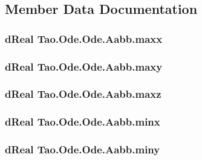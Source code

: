 \subsection{Member Data Documentation}
\hypertarget{struct_tao_1_1_ode_1_1_ode_1_1_aabb_a17707d5ffb42b522263f1e87cf82a1c4}{
\subsubsection[{maxx}]{\setlength{\rightskip}{0pt plus 5cm}dReal {\bf Tao.Ode.Ode.Aabb.maxx}}}
\label{struct_tao_1_1_ode_1_1_ode_1_1_aabb_a17707d5ffb42b522263f1e87cf82a1c4}
\hypertarget{struct_tao_1_1_ode_1_1_ode_1_1_aabb_a9c2841eefd732f6e32b72042b82f31e9}{
\subsubsection[{maxy}]{\setlength{\rightskip}{0pt plus 5cm}dReal {\bf Tao.Ode.Ode.Aabb.maxy}}}
\label{struct_tao_1_1_ode_1_1_ode_1_1_aabb_a9c2841eefd732f6e32b72042b82f31e9}
\hypertarget{struct_tao_1_1_ode_1_1_ode_1_1_aabb_ac5d877495468bd25191c352540e6be92}{
\subsubsection[{maxz}]{\setlength{\rightskip}{0pt plus 5cm}dReal {\bf Tao.Ode.Ode.Aabb.maxz}}}
\label{struct_tao_1_1_ode_1_1_ode_1_1_aabb_ac5d877495468bd25191c352540e6be92}
\hypertarget{struct_tao_1_1_ode_1_1_ode_1_1_aabb_a9140ff61e69a9b990bab195edc186392}{
\subsubsection[{minx}]{\setlength{\rightskip}{0pt plus 5cm}dReal {\bf Tao.Ode.Ode.Aabb.minx}}}
\label{struct_tao_1_1_ode_1_1_ode_1_1_aabb_a9140ff61e69a9b990bab195edc186392}
\hypertarget{struct_tao_1_1_ode_1_1_ode_1_1_aabb_ad894fc0972b1910203f6ab71c3f07f36}{
\subsubsection[{miny}]{\setlength{\rightskip}{0pt plus 5cm}dReal {\bf Tao.Ode.Ode.Aabb.miny}}}
